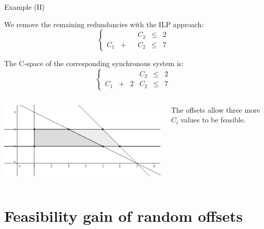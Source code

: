 \documentclass{beamer}
\begin{document}
    \begin{frame}{Example (II)}

    We remove the remaining redundancies with the ILP approach:
    $$
        \left\{
            \begin{array}{cccccc}
                & & & C_2 & \leqslant & 2 \\
                C_1 & + & & C_2 & \leqslant & 7
            \end{array}
        \right.
    $$

    The C-space of the corresponding synchronous system is:
    $$
    \left\{
      \begin{array}{cccccc}
        & & & C_2 & \leqslant & 2 \\
        C_1 & + & 2 & C_2 & \leqslant & 7
      \end{array}
    \right.
    $$

    \begin{columns}[c]


    \includegraphics[width=\textwidth]{figs/cspace_example.png}


    The offsets allow three more $C_i$ values to be feasible.

    \end{columns}

    \end{frame}

\section{Feasibility gain of random offsets}

    \begin{frame}
    \end{frame}
\end{document}
